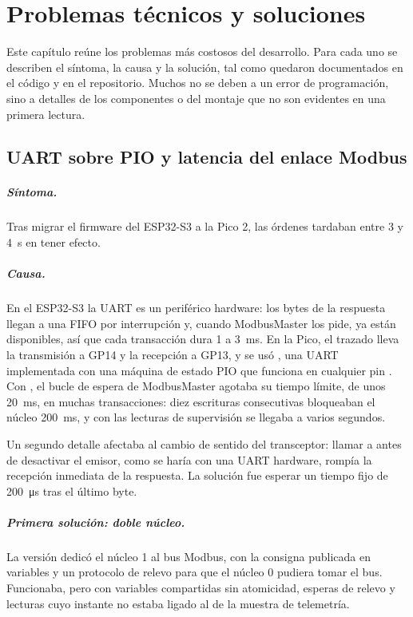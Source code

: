 \chapter{Problemas técnicos y soluciones}
\label{chap:problemas}

Este capítulo reúne los problemas más costosos del desarrollo. Para cada uno se describen el
síntoma, la causa y la solución, tal como quedaron documentados en el código y en el repositorio.
Muchos no se deben a un error de programación, sino a detalles de los componentes o del montaje que
no son evidentes en una primera lectura.

\section{UART sobre PIO y latencia del enlace Modbus}
\label{sec:prob-uart}

\paragraph{Síntoma.} Tras migrar el firmware del ESP32-S3 a la Pico 2, las órdenes tardaban entre 3 y
\SI{4}{\second} en tener efecto.

\paragraph{Causa.} En el ESP32-S3 la UART es un periférico hardware: los bytes de la respuesta llegan
a una FIFO por interrupción y, cuando ModbusMaster los pide, ya están disponibles, así que cada
transacción dura 1 a \SI{3}{\milli\second}. En la Pico, el trazado lleva la transmisión a GP14 y la
recepción a GP13, y se usó , una UART implementada con una máquina de estado PIO
que funciona en cualquier pin . Con , el bucle de espera de ModbusMaster agotaba
su tiempo límite, de unos \SI{20}{\milli\second}, en muchas transacciones: diez escrituras
consecutivas bloqueaban el núcleo \SI{200}{\milli\second}, y con las lecturas de supervisión se
llegaba a varios segundos.

Un segundo detalle afectaba al cambio de sentido del transceptor: llamar a  antes de
desactivar el emisor, como se haría con una UART hardware, rompía la recepción inmediata de la
respuesta. La solución fue esperar un tiempo fijo de \SI{200}{\micro\second} tras el último byte.

\paragraph{Primera solución: doble núcleo.} La versión  dedicó el núcleo 1 al
bus Modbus, con la consigna publicada en variables  y un protocolo de relevo para
que el núcleo 0 pudiera tomar el bus. Funcionaba, pero con variables compartidas sin atomicidad,
esperas de relevo y lecturas cuyo instante no estaba ligado al de la muestra de telemetría.

